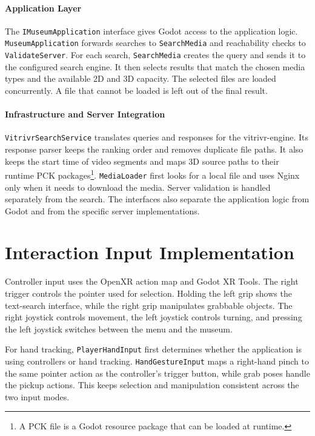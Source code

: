 \pagebreak
\paragraph{Application Layer} The \texttt{IMuseum\allowbreak Application} interface gives Godot access to the application logic. \texttt{Museum\allowbreak Application} forwards searches to \texttt{Search\allowbreak Media} and reachability checks to \texttt{Validate\allowbreak Server}. For each search, \texttt{SearchMedia} creates the query and sends it to the configured search engine. It then selects results that match the chosen media types and the available 2D and 3D capacity. The selected files are loaded concurrently. A file that cannot be loaded is left out of the final result.

\paragraph{Infrastructure and Server Integration} \texttt{Vitrivr\allowbreak Search\allowbreak Service} translates queries and responses for the vitrivr-engine. Its response parser keeps the ranking order and removes duplicate file paths. It also keeps the start time of video segments and maps 3D source paths to their runtime PCK packages\footnote{A PCK file is a Godot resource package that can be loaded at runtime.}. \texttt{MediaLoader} first looks for a local file and uses Nginx only when it needs to download the media. Server validation is handled separately from the search. The interfaces also separate the application logic from Godot and from the specific server implementations.

\section{Interaction Input Implementation}
\label{sec:implementation-interaction-input}

Controller input uses the OpenXR action map and Godot XR Tools. The right trigger controls the pointer used for selection. Holding the left grip shows the text-search interface, while the right grip manipulates grabbable objects. The right joystick controls movement, the left joystick controls turning, and pressing the left joystick switches between the menu and the museum.

For hand tracking, \texttt{PlayerHandInput} first determines whether the application is using controllers or hand tracking. \texttt{HandGestureInput} maps a right-hand pinch to the same pointer action as the controller's trigger button, while grab poses handle the pickup actions. This keeps selection and manipulation consistent across the two input modes.


